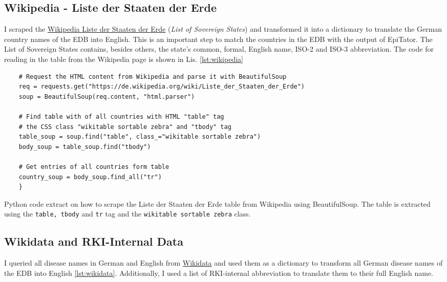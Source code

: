 \subsection{Wikipedia - Liste der Staaten der Erde}\label{wikipedia}
I scraped the \href{https://de.wikipedia.org/wiki/Liste_der_Staaten_der_Erde}{Wikipedia Liste der Staaten der Erde} (\textit{List of Sovereign States}) and transformed it into a dictionary to translate the German country names of the EDB into English. This is an important step to match the countries in the EDB with the output of EpiTator. The List of Sovereign States contains, besides others, the state's common, formal, English name, ISO-2 and ISO-3 abbreviation.
The code for reading in the table from the Wikipedia page is shown in Lis. \ref{lst:wikipedia}

\begin{listing}[h]
  \begin{verbatim}
    # Request the HTML content from Wikipedia and parse it with BeautifulSoup
    req = requests.get("https://de.wikipedia.org/wiki/Liste_der_Staaten_der_Erde")
    soup = BeautifulSoup(req.content, "html.parser")

    # Find table with of all countries with HTML "table" tag
    # the CSS class "wikitable sortable zebra" and "tbody" tag
    table_soup = soup.find("table", class_="wikitable sortable zebra")
    body_soup = table_soup.find("tbody")

    # Get entries of all countries form table
    country_soup = body_soup.find_all("tr")
    }
  \end{verbatim}
  \caption{Python code extract on how to scrape the Liste der Staaten der Erde table from Wikipedia using BeautifulSoup. The table is extracted using the \texttt{table, tbody} and \texttt{tr} tag and the \texttt{wikitable sortable zebra} class.}
  \label{lst:wikipedia}
\end{listing}

\subsection{Wikidata and RKI-Internal Data}\label{wikidata}
I queried all disease names in German and English from \href{https://www.wikidata.org/wiki/Wikidata:Main_Page}{Wikidata} and used them as a dictionary to transform all German disease names of the EDB into English \ref{lst:wikidata}. Additionally, I used a list of RKI-internal abbreviation to translate them to their full English name.

